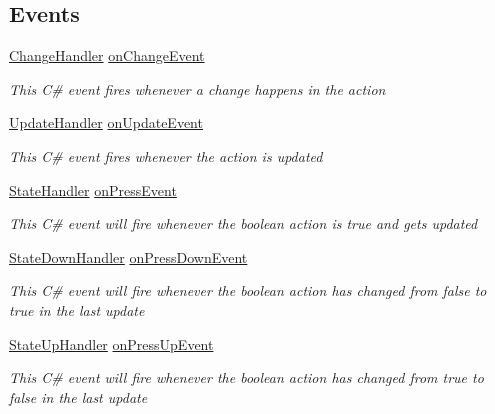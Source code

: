 \subsection*{Events}
\begin{DoxyCompactItemize}
\item 
\mbox{\hyperlink{class_valve_1_1_v_r_1_1_steam_v_r___behaviour___boolean_ac6747cdeceec4d24ddb39b4de05b1ca6}{Change\+Handler}} \mbox{\hyperlink{class_valve_1_1_v_r_1_1_steam_v_r___behaviour___boolean_a19cd995d03f07a98150ba6c466032af9}{on\+Change\+Event}}
\begin{DoxyCompactList}\small\item\em This C\# event fires whenever a change happens in the action \end{DoxyCompactList}\item 
\mbox{\hyperlink{class_valve_1_1_v_r_1_1_steam_v_r___behaviour___boolean_ae98c73afb05e760178c435aa4baa175c}{Update\+Handler}} \mbox{\hyperlink{class_valve_1_1_v_r_1_1_steam_v_r___behaviour___boolean_af7987bf6d371d204514044c91b1a2e8f}{on\+Update\+Event}}
\begin{DoxyCompactList}\small\item\em This C\# event fires whenever the action is updated \end{DoxyCompactList}\item 
\mbox{\hyperlink{class_valve_1_1_v_r_1_1_steam_v_r___behaviour___boolean_a915c126540f6be14cd925ac1679649af}{State\+Handler}} \mbox{\hyperlink{class_valve_1_1_v_r_1_1_steam_v_r___behaviour___boolean_a1e55199fdcd5d8fa714e0ba802b5210f}{on\+Press\+Event}}
\begin{DoxyCompactList}\small\item\em This C\# event will fire whenever the boolean action is true and gets updated \end{DoxyCompactList}\item 
\mbox{\hyperlink{class_valve_1_1_v_r_1_1_steam_v_r___behaviour___boolean_a72b8998f8432175c0bdeec28b33eeb48}{State\+Down\+Handler}} \mbox{\hyperlink{class_valve_1_1_v_r_1_1_steam_v_r___behaviour___boolean_a190d1f5b2453778d2403f0389d31621b}{on\+Press\+Down\+Event}}
\begin{DoxyCompactList}\small\item\em This C\# event will fire whenever the boolean action has changed from false to true in the last update \end{DoxyCompactList}\item 
\mbox{\hyperlink{class_valve_1_1_v_r_1_1_steam_v_r___behaviour___boolean_a6ac1e6383124de89a78d25b5f453bab7}{State\+Up\+Handler}} \mbox{\hyperlink{class_valve_1_1_v_r_1_1_steam_v_r___behaviour___boolean_a25f59fa151fdd77e1856c1d567d8fa59}{on\+Press\+Up\+Event}}
\begin{DoxyCompactList}\small\item\em This C\# event will fire whenever the boolean action has changed from true to false in the last update \end{DoxyCompactList}\end{DoxyCompactItemize}


